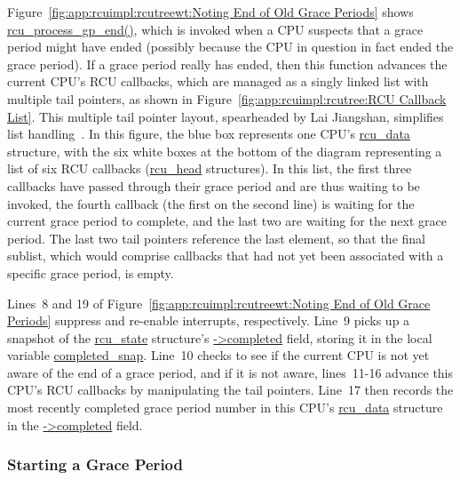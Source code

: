 Figure~\ref{fig:app:rcuimpl:rcutreewt:Noting End of Old Grace Periods}
shows \url{rcu_process_gp_end()}, which is invoked when a CPU suspects
that a grace period might have ended (possibly because the CPU in question
in fact ended the grace period).
If a grace period really has ended, then this function advances the
current CPU's RCU callbacks, which are managed as a singly linked
list with multiple tail pointers, as shown in
Figure~\ref{fig:app:rcuimpl:rcutree:RCU Callback List}.
This multiple tail pointer layout, spearheaded by
Lai Jiangshan, simplifies list
handling~\cite{LaiJiangshan2008NewClassicAlgorithm}.
In this figure, the blue box represents one CPU's \url{rcu_data}
structure, with the six white boxes at the bottom of the diagram
representing a list of six RCU callbacks (\url{rcu_head} structures).
In this list, the first three callbacks have passed through their
grace period and are thus waiting to be invoked, the fourth
callback (the first on the second line) is waiting for the current
grace period to complete, and the last two are waiting for the
next grace period.
The last two tail pointers reference the last element, so that the
final sublist, which would comprise callbacks that had not yet been
associated with a specific grace period, is empty.

Lines~8 and 19 of
Figure~\ref{fig:app:rcuimpl:rcutreewt:Noting End of Old Grace Periods}
suppress and re-enable interrupts, respectively.
Line~9 picks up a snapshot of the \url{rcu_state} structure's
\url{->completed} field, storing it in the local variable
\url{completed_snap}.
Line~10 checks to see if the current CPU is not yet aware of the
end of a grace period, and if it is not aware,
lines~11-16 advance this CPU's RCU callbacks by manipulating the
tail pointers.
Line~17 then records the most recently completed grace period number
in this CPU's \url{rcu_data} structure in the \url{->completed}
field.

\subsubsection{Starting a Grace Period}
\label{app:rcuimpl:rcutreewt:Starting a Grace Period}


